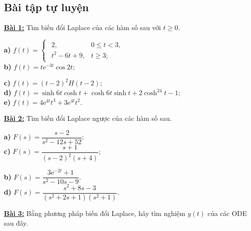 \documentclass[10pt, a4paper]{article}
\begin{document}
	\subsection{Bài tập tự luyện}
	\color{red}\textbf{\underline{Bài 1:}} \color{black} Tìm biến đổi Laplace của các hàm số sau với $t\ge0$. \begin{multicols}{2}
		\begin{flushleft}
			\textbf{a) }$f(t)=\begin{cases}
				\begin{array}{ll}
					2, & 0\le t<3, \\
					t^2-6t+9, & t\ge3;
				\end{array}
			\end{cases}$\\\vspace{3mm}
			\textbf{b) }$f(t)=t\mathrm e^{-3t}\cos2t;$
		\end{flushleft}
		\columnbreak
		\begin{flushleft}
			\textbf{c) }$f(t)=(t-2)^2H(t-2);$\\\vspace{3mm}
			\textbf{d) }$f(t)=\sinh6t\cosh t+\cosh6t\sinh t+2\cosh^24t-1$;\\\vspace{3mm}
			\textbf{e) }$f(t)=4\mathrm e^{4t}t^3+3\mathrm e^{4t}t^2.$
		\end{flushleft}
	\end{multicols}
	\begin{flushleft}
		\color{red}\textbf{\underline{Bài 2:}} \color{black} Tìm biến đổi Laplace ngược của các hàm số sau.
	\end{flushleft}
	\begin{multicols}{2}
		\begin{flushleft}
			\textbf{a) }$F(s)=\dfrac{s-2}{s^2-12s+52};$\\\vspace{3mm}
			\textbf{c) }$F(s)=\dfrac{s+1}{(s-2)^2(s+4)};$
		\end{flushleft}
		\columnbreak
		\begin{flushleft}
			\textbf{b) }$F(s)=\dfrac{3\mathrm e^{-2t}+1}{s^2-10s-9}.$\\\vspace{3mm}
			\textbf{d) }$F(s)=\dfrac{s^2+8s-3}{(s^2+2s+1)(s^2+1)}.$
		\end{flushleft}
	\end{multicols}
	\begin{flushleft}
		\color{red}\textbf{\underline{Bài 3:}} \color{black} Bằng phương pháp biến đổi Laplace, hãy tìm nghiệm $y(t)$ của các ODE sau đây.
	\end{flushleft}
\end{document}

